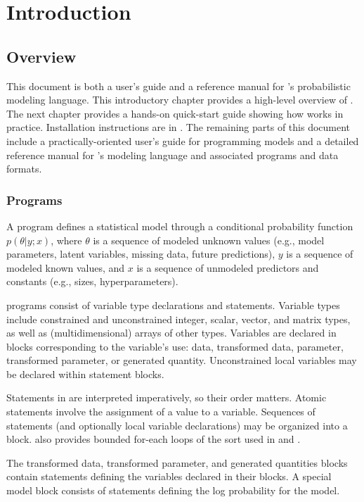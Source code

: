 \part{Introduction}


\chapter{Overview}

\noindent
This document is both a user's guide and a reference manual for
\Stan's probabilistic modeling language.  This introductory chapter
provides a high-level overview of \Stan.  The next chapter provides a
hands-on quick-start guide showing how \Stan works in practice.
Installation instructions are in . The remaining
parts of this document include a practically-oriented user's guide for
programming models and a detailed reference manual for \Stan's
modeling language and associated programs and data formats.

\section{\Stan Programs}

A \Stan program defines a statistical model through a conditional
probability function $p(\theta|y;x)$, where $\theta$ is a sequence of
modeled unknown values (e.g., model parameters, latent variables, missing
data, future predictions), $y$ is a sequence of modeled known 
values, and $x$ is a sequence of unmodeled predictors and constants
(e.g., sizes, hyperparameters).

\Stan programs consist of variable type declarations and statements.
Variable types include constrained and unconstrained integer, scalar,
vector, and matrix types, as well as (multidimensional) arrays of
other types.  Variables are declared in blocks corresponding to the
variable's use: data, transformed data, parameter, transformed
parameter, or generated quantity.  Unconstrained local variables may
be declared within statement blocks.

Statements in \Stan are interpreted imperatively, so their order
matters.  Atomic statements involve the assignment of a value to a
variable.  Sequences of statements (and optionally local variable
declarations) may be organized into a block.  \Stan also provides bounded
for-each loops of the sort used in \R and \BUGS.

The transformed data, transformed parameter, and generated quantities
blocks contain statements defining the variables declared in their
blocks.  A special model block consists of statements defining the log
probability for the model.

